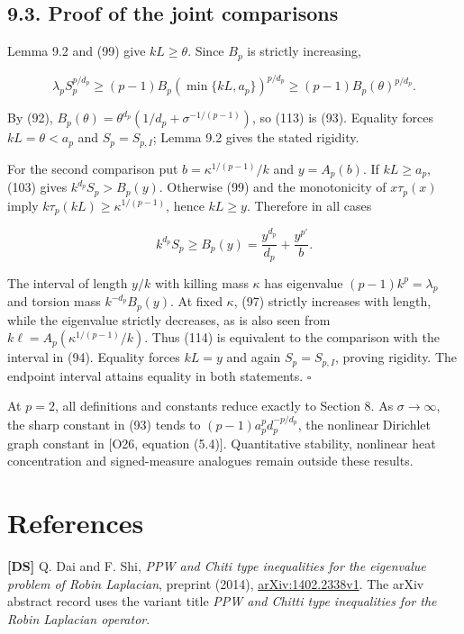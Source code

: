 \documentclass[11pt]{article}
\begin{document}
\subsection{9.3. Proof of the joint
comparisons}\label{proof-of-the-joint-comparisons}

Lemma 9.2 and (99) give \(kL\ge\theta\). Since \(B_p\) is strictly
increasing,

\[
\lambda_p S_p^{p/d_p}
\ge(p-1)B_p(\min\{kL,a_p\})^{p/d_p}
\ge(p-1)B_p(\theta)^{p/d_p}.
\tag{113}
\]

By (92), \(B_p(\theta)=\theta^{d_p}(1/d_p+\sigma^{-1/(p-1)})\), so (113)
is (93). Equality forces \(kL=\theta<a_p\) and \(S_p=S_{p,I}\); Lemma
9.2 gives the stated rigidity.

For the second comparison put \(b=\kappa^{1/(p-1)}/k\) and \(y=A_p(b)\).
If \(kL\ge a_p\), (103) gives \(k^{d_p}S_p>B_p(y)\). Otherwise (99) and
the monotonicity of \(x\tau_p(x)\) imply
\(k\tau_p(kL)\ge\kappa^{1/(p-1)}\), hence \(kL\ge y\). Therefore in all
cases

\[
k^{d_p}S_p\ge B_p(y)
=\frac{y^{d_p}}{d_p}+\frac{y^{p'}}b.
\tag{114}
\]

The interval of length \(y/k\) with killing mass \(\kappa\) has
eigenvalue \((p-1)k^p=\lambda_p\) and torsion mass \(k^{-d_p}B_p(y)\).
At fixed \(\kappa\), (97) strictly increases with length, while the
eigenvalue strictly decreases, as is also seen from
\(k\ell=A_p(\kappa^{1/(p-1)}/k)\). Thus (114) is equivalent to the
comparison with the interval in (94). Equality forces \(kL=y\) and again
\(S_p=S_{p,I}\), proving rigidity. The endpoint interval attains
equality in both statements. \(\square\)

At \(p=2\), all definitions and constants reduce exactly to Section 8.
As \(\sigma\to\infty\), the sharp constant in (93) tends to
\((p-1)a_p^p d_p^{-p/d_p}\), the nonlinear Dirichlet graph constant in
{[}O26, equation (5.4){]}. Quantitative stability, nonlinear heat
concentration and signed-measure analogues remain outside these results.

\raggedright{}\section{References}\label{references}

\textbf{{[}DS{]}} Q. Dai and F. Shi, \emph{PPW and Chiti type
inequalities for the eigenvalue problem of Robin Laplacian}, preprint
(2014), \href{https://arxiv.org/abs/1402.2338v1}{arXiv:1402.2338v1}. The
arXiv abstract record uses the variant title \emph{PPW and Chitti type
inequalities for the Robin Laplacian operator}.
\end{document}
